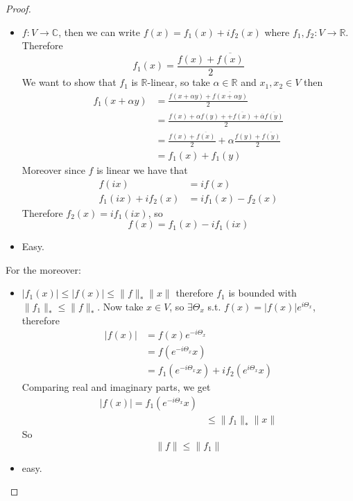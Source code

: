 \documentclass[11pt,a4paper]{article}
\theoremstyle{definition}
\theoremstyle{plain}
\theoremstyle{remark}
\newcommand{\R}{\mathbb{R}}
\newcommand{\C}{\mathbb{C}}
\newcommand{\abs}[1]{\lvert #1 \rvert}
\newcommand{\norm}[1]{\lVert #1 \rVert}
\newcommand{\1}{\mathbbm{1}}
\begin{document}
\begin{proof}
    \begin{itemize}
        \item[$(\implies)$] $f \colon V \to \C$, then we can write $f(x) = f_1(x) + if_2(x)$ where $f_1, f_2 \colon V \to \R$. Therefore 
        $$f_1(x) = \frac{f(x) + \overline{f(x)}}{2}$$
        We want to show that $f_1$ is $\R$-linear, so take $\alpha \in \R$ and $x_1, x_2 \in V$ then 
        \begin{align*}
            f_1(x + \alpha y) &= \frac{f(x+ \alpha y) + \overline{f(x + \alpha y)}}{2} \\
            &= \frac{f(x) + \alpha f(y) + + \overline{f(x)} + \overline{\alpha} \overline{f(y)}}{2} \\
            &= \frac{f(x) + \overline{f(x)}}{2} + \alpha \frac{f(y) + \overline{f(y)}}{2} \\
            &= f_1 (x) + f_1(y)
        \end{align*}
        Moreover since $f$ is linear we have that 
        \begin{align*}
            f(ix) &= i f(x) \\
            f_1(ix) + if_2(x) &= if_1(x) - f_2(x) 
        \end{align*}
        Therefore $f_2(x) = if_1(ix)$, so 
        $$f(x) = f_1(x)  - i f_1(ix)$$

        \item[$\impliedby$] Easy.
    \end{itemize}

    For the moreover: 
    \begin{itemize}
        \item[$\implies$] $\abs{f_1(x)} \le \abs{f(x)} \le \norm{f}_* \norm{x}$ therefore $f_1$ is bounded with $\norm{f_1}_* \le \norm{f}_*$. Now 
        take $x \in V$, so $\exists \Theta_x$ s.t. $f(x) = \abs{f(x)} e^{i \Theta_x}$, therefore 
        \begin{align*}
            \abs{f(x)} &= f(x) e^{- i \Theta_x} \\
            &= f(e^{- i \Theta_x} x) \\
            &= f_1(e^{- i \Theta_x} x) + i f_2 (e^{i \Theta_x} x)  
        \end{align*}
        Comparing real and imaginary parts, we get 
        \begin{align*}
            \abs{f(x)} = f_1(e^{- i \Theta_x} x) \\
            &\le \norm{f_1}_* \norm{x}
        \end{align*}
        So 
        $$\norm{f} \le \norm{f_1}$$

        \item[$\impliedby$] easy. 
    \end{itemize}
\end{proof}
\end{document}
